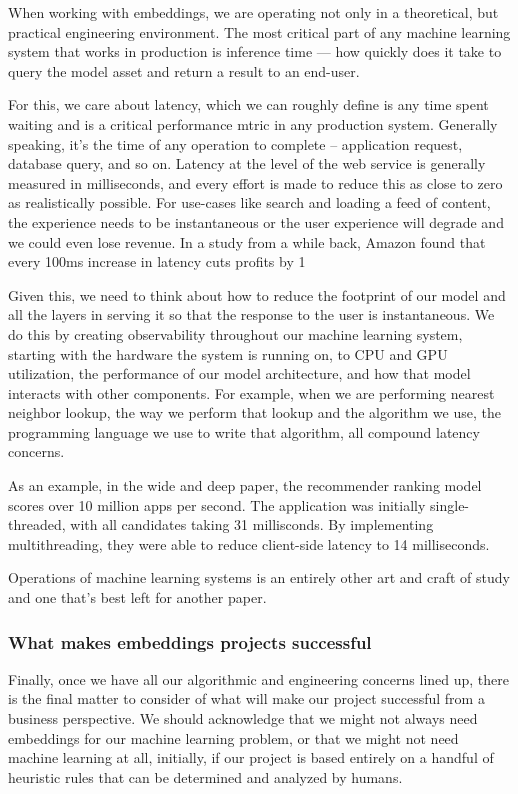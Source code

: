 \documentclass[11pt, table]{diazessay} %
\begin{document}
\begin{sloppypar}
When working with embeddings, we are operating not only in a theoretical, but practical engineering environment. The most critical part of any machine learning system that works in production is inference time --- how quickly does it take to query the model asset and return a result to an end-user. 

For this, we care about latency, which we can roughly define is any time spent waiting and is a critical performance mtric in any production system\citep{gregg2014systems}. Generally speaking, it's the time of any operation to complete -- application request, database query, and so on. Latency at the level of the web service is generally measured in milliseconds, and every effort is made to reduce this as close to zero as realistically possible. For use-cases like search and loading a feed of content, the experience needs to be instantaneous or the user experience will degrade and we could even lose revenue. In a study from a while back, Amazon found that every 100ms increase in latency cuts profits by 1%

Given this, we need to think about how to reduce the footprint of our model and all the layers in serving it so that the response to the user is instantaneous. We do this by creating observability throughout our machine learning system, starting with the hardware the system is running on, to CPU and GPU utilization, the performance of our model architecture, and how that model interacts with other components. For example, when we are performing nearest neighbor lookup, the way we perform that lookup and the algorithm we use, the programming language we use to write that algorithm, all compound latency concerns.  

As an example, in the wide and deep paper, the recommender ranking model scores over 10 million apps per second. The application was initially single-threaded, with all candidates taking 31 millisconds. By implementing multithreading, they were able to reduce client-side latency to 14 milliseconds\citep{cheng2016wide}.

Operations of machine learning systems is an entirely other art and craft of study and one that's best left for another paper\citep{kreuzberger2022machine}. 

\subsubsection{What makes embeddings projects successful}
Finally, once we have all our algorithmic and engineering concerns lined up, there is the final matter to consider of what will make our project successful from a business perspective. We should acknowledge that we might not always need embeddings for our machine learning problem, or that we might not need machine learning at all, initially, if our project is based entirely on a handful of heuristic rules that can be determined and analyzed by humans\citep{zinkevich2017rules}. 


\end{sloppypar}
\end{document}
